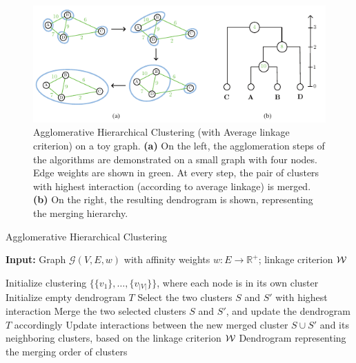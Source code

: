 \begin{figure}[t]
    \centering
    \includegraphics[width=\linewidth]{figures/example-HC.pdf}%
    \caption[Agglomerative Hierarchical Clustering demonstrated on a toy graph]{Agglomerative Hierarchical Clustering (with Average linkage criterion) on a toy graph. \textbf{(a)} On the left, the agglomeration steps of the algorithms are demonstrated on a small graph with four nodes. Edge weights are shown in green. At every step, the pair of clusters with highest interaction (according to average linkage) is merged. \textbf{(b)} On the right, the resulting dendrogram is shown, representing the merging hierarchy.}
    \label{fig:example_HC}
\end{figure}
\begin{algorithm}[t]
\footnotesize
  \begin{flushleft}
  \footnotesize
  \caption{Agglomerative Hierarchical Clustering}
   \hspace*{\algorithmicindent} \textbf{Input:} Graph $\mathcal{G}(V,E,w)$ with affinity weights $w:E \rightarrow \mathbb{R}^+$; linkage criterion $\mathcal{W}{}$ \\
  \begin{algorithmic}[1]
  \footnotesize
      \State Initialize clustering $\{\{v_1\}, \ldots, \{v_{|V|}\}\}$, where each node is in its own cluster
      \State Initialize empty dendrogram $T$
      \Repeat 
        \State Select the two clusters $S$ and $S'$ with highest interaction
        \State Merge the two selected clusters $S$ and $S'$, and update the dendrogram $T$ accordingly
        \State Update interactions between the new merged cluster $S \cup S'$ and its neighboring clusters, based on the linkage criterion $\mathcal{W}{}$
      \State
      \Return Dendrogram representing the merging order of clusters
  \end{algorithmic}
    \label{HC_algoritm}
  \end{flushleft}

\end{algorithm}


